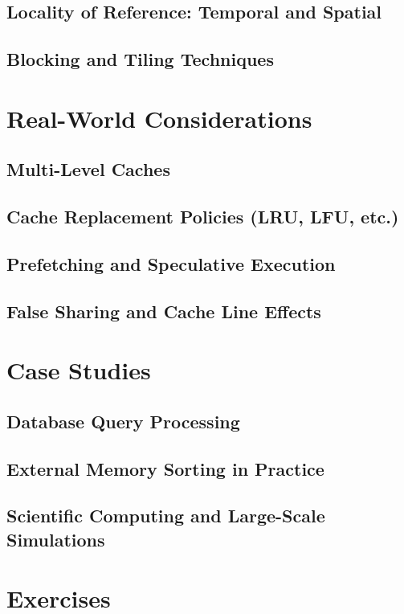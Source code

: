 \subsection{Locality of Reference: Temporal and Spatial}
\subsection{Blocking and Tiling Techniques}

\section{Real-World Considerations}
\subsection{Multi-Level Caches}
\subsection{Cache Replacement Policies (LRU, LFU, etc.)}
\subsection{Prefetching and Speculative Execution}
\subsection{False Sharing and Cache Line Effects}

\section{Case Studies}
\subsection{Database Query Processing}
\subsection{External Memory Sorting in Practice}
\subsection{Scientific Computing and Large-Scale Simulations}

\section{Exercises}